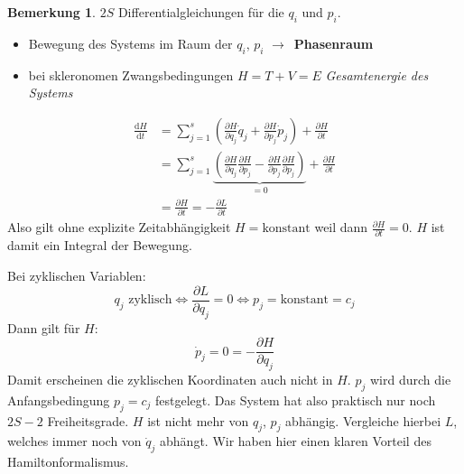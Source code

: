 \documentclass[oneside]{book}
\theoremstyle{definition}
\newtheorem*{bemerkung*}{Bemerkung}
\newcommand{\conseq}{$\rightarrow$~}
\renewcommand{\d}{\mathrm d}
\newcommand{\ddd}[2]{\frac{\d #1}{\d #2}}
\newcommand{\ffpartial}[2]{\frac{\partial #1}{\partial #2}}
\newcommand{\const}{\text{konstant}}
\begin{document}
\begin{bemerkung*}
	$2S$ Differentialgleichungen für die $q_i$ und $p_i$.
	\begin{itemize}
		\item Bewegung des Systems im Raum der $q_i$, $p_i$ \conseq \textbf{Phasenraum}
		\item bei skleronomen Zwangsbedingungen $H = T + V = E$ \textit{Gesamtenergie des Systems}
	\end{itemize}
\end{bemerkung*}
\begin{align*}
	\ddd{H}{t} &= \sum_{j=1}^{s} (\ffpartial{H}{q_j} \dot{q}_j + \ffpartial{H}{p_j} \dot{p}_j) + \ffpartial{H}{t}\\
	&= \sum_{j=1}^{s} \underbrace{(\ffpartial{H}{q_j} \ffpartial{H}{p_j} - \ffpartial{H}{p_j} \ffpartial{H}{p_j})}_{=0}+ \ffpartial{H}{t}\\
	&= \ffpartial{H}{t} = - \ffpartial{L}{t}
\end{align*} 
Also gilt ohne explizite Zeitabhängigkeit $H = \const$ weil dann $\ffpartial{H}{t} = 0$. $H$ ist damit ein Integral der Bewegung.

Bei zyklischen Variablen:
$$q_j \text{~zyklisch} \Leftrightarrow \ffpartial{L}{q_j} = 0 \Leftrightarrow p_j = \const = c_j$$
Dann gilt für $H$:
$$\dot{p}_j = 0 = -\ffpartial{H}{q_j}$$
Damit erscheinen die zyklischen Koordinaten auch nicht in $H$.
$p_j$ wird durch die Anfangsbedingung $p_j = c_j$ festgelegt. Das System hat also praktisch nur noch $2S - 2$ Freiheitsgrade.
$H$ ist nicht mehr von $q_j$, $p_j$ abhängig. Vergleiche hierbei $L$, welches immer noch von $\dot{q}_j$ abhängt. Wir haben hier einen klaren Vorteil des Hamiltonformalismus.
\end{document}
